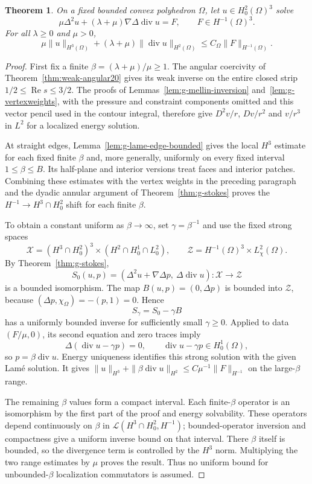 \documentclass[11pt,a4paper]{article}
\newtheorem{theorem}{Theorem}[section]
\theoremstyle{remark}
\numberwithin{equation}{section}
\begin{document}
\begin{theorem}\label{thm:g-lameuniform}
On a fixed bounded convex polyhedron $\Omega$, let $u\in H^2_0(\Omega)^3$
solve
\[
 \mu\Delta^2u+(\lambda+\mu)\nabla\Delta\operatorname{div}u=F,
 \qquad F\in H^{-1}(\Omega)^3.
\]
For all $\lambda\ge0$ and $\mu>0$,
\[
 \mu\|u\|_{H^3(\Omega)}
 +(\lambda+\mu)\|\operatorname{div}u\|_{H^2(\Omega)}
 \le C_\Omega\|F\|_{H^{-1}(\Omega)}.
\]
\end{theorem}
\begin{proof}
First fix a finite $\beta=(\lambda+\mu)/\mu\ge1$. The angular
coercivity of Theorem~\ref{thm:weak-angular20} gives its weak inverse on the entire
closed strip $1/2\le\operatorname{Re}s\le3/2$. The proofs of
Lemmas~\ref{lem:g-mellin-inversion} and~\ref{lem:g-vertexweights}, with the
pressure and constraint components omitted and this vector pencil used in the
contour integral, therefore give
$D^2v/r$, $Dv/r^2$ and $v/r^3$ in $L^2$ for a localized energy solution.

At straight edges, Lemma~\ref{lem:g-lame-edge-bounded} gives the local
$H^3$ estimate for each fixed finite $\beta$ and, more generally, uniformly
on every fixed interval $1\le\beta\le B$. Its half-plane and interior
versions treat faces and interior patches. Combining these estimates with
the vertex weights in the preceding paragraph and the dyadic annular
argument of Theorem~\ref{thm:g-stokes} proves the
$H^{-1}\to H^3\cap H^2_0$ shift for each finite $\beta$.

To obtain a constant uniform as $\beta\to\infty$, set $\gamma=\beta^{-1}$
and use the fixed strong spaces
\[
 \mathcal X=(H^3\cap H^2_0)^3\times(H^2\cap H^1_0\cap L^2_0),\qquad
 \mathcal Z=H^{-1}(\Omega)^3\times L^2_\chi(\Omega).
\]
By Theorem~\ref{thm:g-stokes},
\[
 S_0(u,p)=(\Delta^2u+\nabla\Delta p,\ \Delta\operatorname{div}u)
 :\mathcal X\longrightarrow\mathcal Z
\]
is a bounded isomorphism. The map $B(u,p)=(0,\Delta p)$ is bounded into
$\mathcal Z$, because
$(\Delta p,\chi_\Omega)=-(p,1)=0$. Hence
\begin{equation}\label{eq:g-strong-space-perturbation}
 S_\gamma=S_0-\gamma B
\end{equation}
has a uniformly bounded inverse for sufficiently small $\gamma\ge0$. Applied to data $(F/\mu,0)$, its second equation and
zero traces imply
\[
 \Delta(\operatorname{div}u-\gamma p)=0,
 \qquad \operatorname{div}u-\gamma p\in H^1_0(\Omega),
\]
so $p=\beta\operatorname{div}u$. Energy uniqueness identifies this strong
solution with the given Lam\'e solution. It gives
$\|u\|_{H^3}+\|\beta\operatorname{div}u\|_{H^2}
\le C\mu^{-1}\|F\|_{H^{-1}}$ on the large-$\beta$ range.

The remaining $\beta$ values form a compact interval. Each finite-$\beta$
operator is an isomorphism by the first part of the proof and energy
solvability. These operators depend continuously on $\beta$ in
$\mathcal L(H^3\cap H^2_0,H^{-1})$; bounded-operator inversion and compactness
give a uniform inverse bound on that interval. There $\beta$ itself is bounded,
so the divergence term is controlled by the $H^3$ norm. Multiplying the two
range estimates by $\mu$ proves the result. Thus no uniform bound for
unbounded-$\beta$ localization commutators is assumed.
\end{proof}
\end{document}
